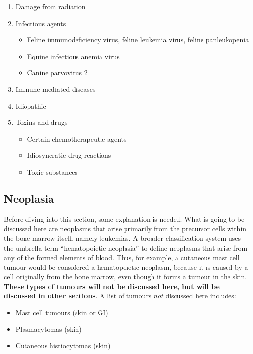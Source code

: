 \documentclass[openany]{article}
\providecommand{\tightlist}{%
  \setlength{\itemsep}{0pt}\setlength{\parskip}{0pt}}
\begin{document}
\begin{enumerate}
\def\labelenumi{\arabic{enumi}.}
\tightlist
\item
  Damage from radiation
\item
  Infectious agents

  \begin{itemize}
  \tightlist
  \item
    Feline immunodeficiency virus, feline leukemia virus, feline
    panleukopenia
  \item
    Equine infectious anemia virus
  \item
    Canine parvovirus 2
  \end{itemize}
\item
  Immune-mediated diseases
\item
  Idiopathic
\item
  Toxins and drugs

  \begin{itemize}
  \tightlist
  \item
    Certain chemotherapeutic agents
  \item
    Idiosyncratic drug reactions
  \item
    Toxic substances
  \end{itemize}
\end{enumerate}

\subsection{Neoplasia}\label{neoplasia}

Before diving into this section, some explanation is needed. What is
going to be discussed here are neoplasms that arise primarily from the
precursor cells within the bone marrow itself, namely leukemias. A
broader classification system uses the umbrella term ``hematopoietic
neoplasia'' to define neoplasms that arise from any of the formed
elements of blood. Thus, for example, a cutaneous mast cell tumour would
be considered a hematopoietic neoplasm, because it is caused by a cell
originally from the bone marrow, even though it forms a tumour in the
skin. \textbf{These types of tumours will not be discussed here, but
will be discussed in other sections}. A list of tumours \emph{not}
discussed here includes:

\begin{itemize}
\tightlist
\item
  Mast cell tumours (skin or GI)
\item
  Plasmacytomas (skin)
\item
  Cutaneous histiocytomas (skin)
\end{itemize}
\end{document}
